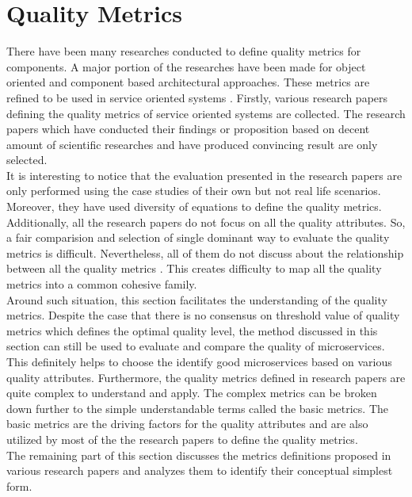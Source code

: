 \section{Quality Metrics}\label{section:quality_of_service/quality_metrics}
There have been many researches conducted to define quality metrics for components. A major portion of the researches have been made for object oriented and component based architectural approaches. These metrics are refined to be used in service oriented systems \cite{Xiao-jun:2015aa, Sindhgatta:2015aa}. Firstly, various research papers defining the quality metrics of service oriented systems are collected. The research papers which have conducted their findings or proposition based on decent amount of scientific researches and have produced convincing result are only selected.\\
It is interesting to notice that the evaluation presented in the research papers are only performed using the case studies of their own but not real life scenarios. Moreover, they have used diversity of equations to define the quality metrics. Additionally, all the research papers do not focus on all the quality attributes. So, a fair comparision and selection of single dominant way to evaluate the quality metrics is difficult. Nevertheless, all of them do not discuss about the relationship between all the quality metrics \cite{Elhag:2014aa}.  This creates difficulty to map all the quality metrics into a common cohesive family. 
\\
Around such situation, this section facilitates the understanding of the quality metrics. Despite the case that there is no consensus on threshold value of quality metrics which defines the optimal quality level, the method discussed in this section can still be used to evaluate and compare the quality of microservices. This definitely helps to choose the identify good microservices based on various quality attributes. Furthermore, the quality metrics defined in research papers are quite complex to understand and apply. The complex metrics can be broken down further to the simple understandable terms called the  basic metrics. The basic metrics are the driving factors for the quality attributes and are also utilized by most of the the research papers to define the quality metrics.
\\
The remaining part of this section discusses the metrics definitions proposed in various research papers and analyzes them to identify their conceptual simplest form.

